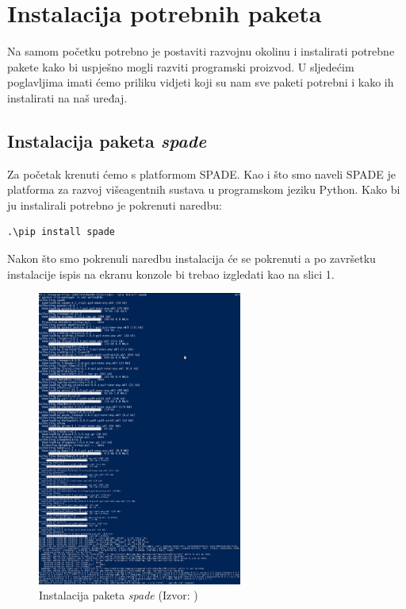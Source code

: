 \documentclass[]{foi} %
\begin{document}
\chapter{Instalacija potrebnih paketa}
Na samom početku potrebno je postaviti razvojnu okolinu i instalirati potrebne pakete kako bi uspješno mogli razviti programski proizvod. U sljedećim poglavljima imati ćemo priliku vidjeti koji su nam sve paketi potrebni i kako ih instalirati na naš uređaj.
\section{Instalacija paketa \textit{spade}}
Za početak krenuti ćemo s platformom SPADE. Kao i što smo naveli SPADE je platforma za razvoj višeagentnih sustava u programskom jeziku Python. Kako bi ju instalirali potrebno je pokrenuti naredbu: \begin{verbatim}.\pip install spade\end{verbatim} Nakon što smo pokrenuli naredbu instalacija će se pokrenuti a po završetku instalacije ispis na ekranu konzole bi trebao izgledati kao na slici 1.

\begin{figure}[h!]
    \centering
    \includegraphics[width=0.6\textwidth]{slike/spade-install.jpg}
    \caption{Instalacija paketa \textit{spade} (Izvor: \citeauthor{ispisInstalacijeSpade} \citeyear{ispisInstalacijeSpade})}
    \label{fig:instalacijaSPADE}
\end{figure}
\end{document}
